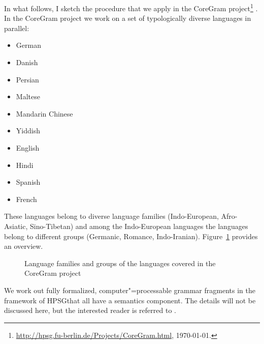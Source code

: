 In what follows, I sketch the procedure that we apply in the CoreGram project\footnote{
\url{http://hpsg.fu-berlin.de/Projects/CoreGram.html}, \today.
} \citep{MuellerCoreGramBrief,MuellerCoreGram}. In the CoreGram project we work on a set of
typologically diverse languages in parallel:
\begin{itemize}
\item German  \citep{MuellerLehrbuch1,MuellerPredication,MuellerCopula,MOe2011a,MOe2013a,MuellerArten,MuellerGS}
\item Danish  \citep{Oersnes2009a,MuellerPredication,MuellerCopula,MOe2011a,MOe2013a,MOe2013b,MOeDanish}
\item Persian \citep*{MuellerPersian,MG2010a}
\item Maltese \citep{MuellerMalteseSketch}
\item Mandarin Chinese \citep{Lipenkova2009a,ML2009a,ML2013a,MLChinese}
\item Yiddish \citep{MOe2011a}
\item English \citep{MuellerPredication,MuellerCopula,MOe2013a}
\item Hindi
\item Spanish \citep{Machicao-y-Priemer2015a}
\item French
\end{itemize}
\noindent
These languages belong to diverse language families 
(Indo-European, %
 Afro-Asiatic,  %
 Sino-Tibetan) %
and among the Indo-European languages the languages belong to different groups (Germanic, Romance,
Indo-Iranian). Figure~\ref{fig-lang-fams} provides an overview.
\begin{figure}[htb]
\caption{Language families and groups of the languages covered in the CoreGram project}\label{fig-lang-fams}
\end{figure}%
We work out fully formalized, computer"=processable grammar fragments in the framework of
HPSG\indexhpsg that all have a semantics component. The details will not be discussed here, but the
interested reader is referred to . 

